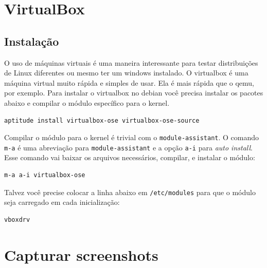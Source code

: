 \documentclass[12pt,brazil]{book}
\begin{document}


\chapter{VirtualBox}
\label{cha:virtualbox}

\section{Instalação}
\label{sec:instalacao-6}

O uso de máquinas virtuais é uma maneira interessante para testar
distribuições de Linux diferentes ou mesmo ter um windows instalado.
O virtualbox é uma máquina virtual muito rápida e simples de usar. Ela
é mais rápida que o qemu, por exemplo. Para instalar o virtualbox no
debian você precisa instalar os pacotes abaixo e compilar o módulo
específico para o kernel.

\begin{verbatim}
aptitude install virtualbox-ose virtualbox-ose-source
\end{verbatim}

Compilar o módulo para o kernel é trivial com o
\texttt{module-assistant}. O comando \texttt{m-a} é uma abreviação
para \texttt{module-assistant} e a opção \texttt{a-i} para
\textit{auto install}. Esse comando vai baixar os arquivos
necessários, compilar, e instalar o módulo:

\begin{verbatim}
m-a a-i virtualbox-ose
\end{verbatim}

Talvez você precise colocar a linha abaixo em \texttt{/etc/modules}
para que o módulo seja carregado em cada inicialização:

\begin{verbatim}
vboxdrv
\end{verbatim}

\chapter{Capturar screenshots}
\label{cha:capt-scre}
\end{document}
